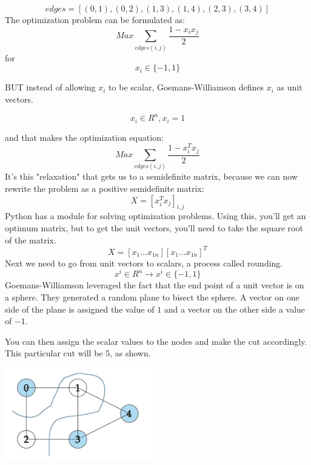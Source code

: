 $$ edges = [(0,1),
        (0,2),
        (1,3),
        (1,4),
        (2,3),
        (3,4)] $$
The optimization problem can be formulated as:
$$
Max\sum_{edges(i,j)}{}\frac{1 - x_{i}x_{j}}{2}
$$
for
$$
 x_{i}\in \{ -1,1 \}
$$

BUT instead of allowing $x_{i}$ to be scalar, Goemans-Williamson defines $x_{i}$ as unit vectors.

$$
 x_{i}\in R^n, x_{i}=1 
$$

and that makes the optimization equation:
$$
Max\sum_{edges(i,j)}{}\frac{1 - x_{i}^{T}x_{j}}{2}
$$
It's this "relaxation" that gets us to a semidefinite matrix, because we can now rewrite the problem as a positive semidefinite matrix:
$$
X = \left[ x_{i}^{T}x_{j} \right]_{i,j}
$$
Python has a module for solving optimization problems. Using this, you'll get an optimum matrix, but to get the unit vectors, you'll need to take the square root of the matrix. 
$$
X = \left[ x_{1}...x_{1n} \right]\left[ x_{1}...x_{1n} \right]^{T}
$$
Next we need to go from unit vectors to scalars, a process called rounding.
$$
x^{i}\in R^n \to x^{i}\in \{ -1,1 \}
$$
Goemans-Williamson leveraged the fact that the end point of a unit vector is on a sphere. They generated a random plane to bisect the sphere. A vector on one side of the plane is assigned the value of $1$ and a vector on the other side a value of $-1$.

You can then assign the scalar values to the nodes and make the cut accordingly. This particular cut will be 5, as shown.

\includegraphics[width=0.5\textwidth]{max-cut.png}

